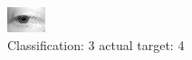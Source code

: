 \begin{figure}[h!]
\begin{center}
\includegraphics[width=0.60\columnwidth]{figures/ID2668_class_3_target_4.png}
\end{center}
\caption{ Classification: 3 actual target: 4}
\label{fig:ID2668_class_3_target_4}
\end{figure}
